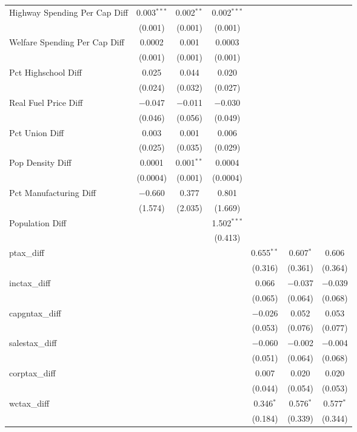 \begin{table}[!htbp]
\begin{tabular}{@{\extracolsep{5pt}}lcccccc}
  Highway Spending Per Cap Diff & 0.003$^{***}$ & 0.002$^{**}$ & 0.002$^{***}$ &  &  &  \\ 
  & (0.001) & (0.001) & (0.001) &  &  &  \\ 
  Welfare Spending Per Cap Diff & 0.0002 & 0.001 & 0.0003 &  &  &  \\ 
  & (0.001) & (0.001) & (0.001) &  &  &  \\ 
  Pct Highschool Diff & 0.025 & 0.044 & 0.020 &  &  &  \\ 
  & (0.024) & (0.032) & (0.027) &  &  &  \\ 
  Real Fuel Price Diff & $-$0.047 & $-$0.011 & $-$0.030 &  &  &  \\ 
  & (0.046) & (0.056) & (0.049) &  &  &  \\ 
  Pct Union Diff & 0.003 & 0.001 & 0.006 &  &  &  \\ 
  & (0.025) & (0.035) & (0.029) &  &  &  \\ 
  Pop Density Diff & 0.0001 & 0.001$^{**}$ & 0.0004 &  &  &  \\ 
  & (0.0004) & (0.001) & (0.0004) &  &  &  \\ 
  Pct Manufacturing Diff & $-$0.660 & 0.377 & 0.801 &  &  &  \\ 
  & (1.574) & (2.035) & (1.669) &  &  &  \\ 
  Population Diff &  &  & 1.502$^{***}$ &  &  &  \\ 
  &  &  & (0.413) &  &  &  \\ 
  ptax\_diff &  &  &  & 0.655$^{**}$ & 0.607$^{*}$ & 0.606 \\ 
  &  &  &  & (0.316) & (0.361) & (0.364) \\ 
  inctax\_diff &  &  &  & 0.066 & $-$0.037 & $-$0.039 \\ 
  &  &  &  & (0.065) & (0.064) & (0.068) \\ 
  capgntax\_diff &  &  &  & $-$0.026 & 0.052 & 0.053 \\ 
  &  &  &  & (0.053) & (0.076) & (0.077) \\ 
  salestax\_diff &  &  &  & $-$0.060 & $-$0.002 & $-$0.004 \\ 
  &  &  &  & (0.051) & (0.064) & (0.068) \\ 
  corptax\_diff &  &  &  & 0.007 & 0.020 & 0.020 \\ 
  &  &  &  & (0.044) & (0.054) & (0.053) \\ 
  wctax\_diff &  &  &  & 0.346$^{*}$ & 0.576$^{*}$ & 0.577$^{*}$ \\ 
  &  &  &  & (0.184) & (0.339) & (0.344) \\ 

\end{tabular}
\end{table}
